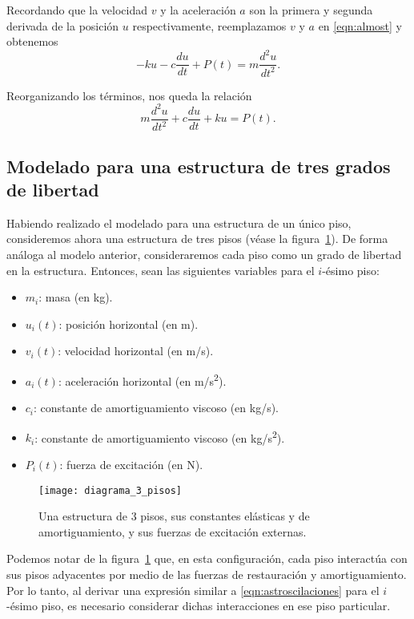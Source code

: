 Recordando que la velocidad \(v\) y la aceleración \(a\) son la primera y segunda derivada de la posición \(u\) respectivamente, reemplazamos \(v\) y \(a\) en \eqref{eqn:almost} y obtenemos
\begin{equation}
    -ku - c\frac{du}{dt} + P(t) = m\frac{d^2u}{dt^2}
.\end{equation}

Reorganizando los términos, nos queda la relación
\begin{equation}\label{eqn:astroscilaciones}
    m\frac{d^2u}{dt^2} + c\frac{du}{dt} + ku = P(t)
.\end{equation}

\subsection{Modelado para una estructura de tres grados de libertad}

Habiendo realizado el modelado para una estructura de un único piso, consideremos ahora una estructura de tres pisos (véase la figura~\ref{fig:3-floor-diagram}). De forma análoga al modelo anterior, consideraremos cada piso como un grado de libertad en la estructura. Entonces, sean las siguientes variables para el \(i\)-ésimo piso:

\begin{itemize}
    \item \(m_i\): masa (en \si{kg}).
    \item \(u_i(t)\): posición horizontal (en \si{m}).
    \item \(v_i(t)\): velocidad horizontal (en \si{m/s}).
    \item \(a_i(t)\): aceleración horizontal (en \si{m/s^2}).
    \item \(c_i\): constante de amortiguamiento viscoso (en \si{kg/s}).
    \item \(k_i\): constante de amortiguamiento viscoso (en \si{kg/s^2}).
    \item \(P_i(t)\): fuerza de excitación (en \si{N}).
\end{itemize}

\begin{figure}[ht!]
    \centering
    \texttt{[image: diagrama\_3\_pisos]}
    \caption{Una estructura de 3 pisos, sus constantes elásticas y de amortiguamiento, y sus fuerzas de excitación externas.}
    \label{fig:3-floor-diagram}
\end{figure}

Podemos notar de la figura~\ref{fig:3-floor-diagram} que, en esta configuración, cada piso interactúa con sus pisos adyacentes por medio de las fuerzas de restauración y amortiguamiento. Por lo tanto, al derivar una expresión similar a \eqref{eqn:astroscilaciones} para el \(i\)-ésimo piso, es necesario considerar dichas interacciones en ese piso particular.

